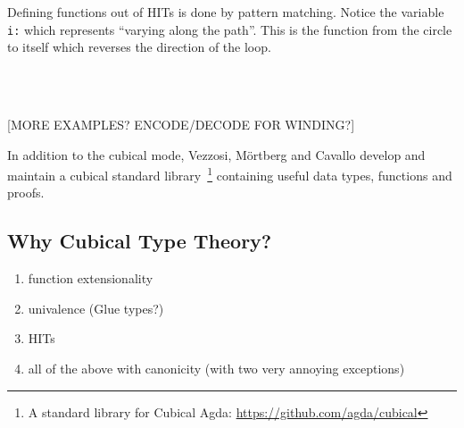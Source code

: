 Defining functions out of HITs is done by pattern matching. Notice the variable
\texttt{i:\I} which represents ``varying along the path''.
This is the function from the circle to itself which reverses the direction of the loop.

\begin{code}%
\>[0]\AgdaSpace{}%
\AgdaSymbol{:}\AgdaSpace{}%
\AgdaSpace{}%
\AgdaSpace{}%
\<%
\\
\>[0]\AgdaSpace{}%
\AgdaSpace{}%
\AgdaSymbol{=}\AgdaSpace{}%
\<%
\\
\>[0]\AgdaSpace{}%
\AgdaSymbol{(}\AgdaSpace{}%
\AgdaSymbol{)}\AgdaSpace{}%
\AgdaSymbol{=}\AgdaSpace{}%
\AgdaSpace{}%
\AgdaSymbol{(}\AgdaOperator{\AgdaPrimitive{\textasciitilde{}}}\AgdaSpace{}%
\AgdaSymbol{)}\<%
\end{code}

[MORE EXAMPLES? ENCODE/DECODE FOR WINDING?]

%
%


In addition to the cubical mode, Vezzosi, M\"ortberg and Cavallo develop and
maintain a cubical standard library~\footnote[1]{A standard library for Cubical
  Agda: \url{https://github.com/agda/cubical}} containing useful data types,
functions and proofs.

\subsection{Why Cubical Type Theory?}
\begin{enumerate}
  \item function extensionality
  \item univalence (Glue types?)
  \item HITs
  \item all of the above with canonicity (with two very annoying exceptions)
\end{enumerate}

